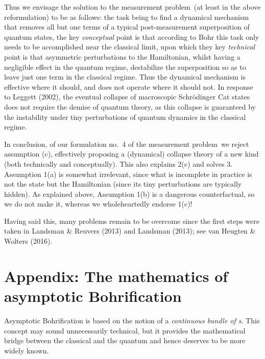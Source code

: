 \documentclass[12pt]{article}
\newcommand{\mmp}{measurement problem}
\begin{document}
 Thus we envisage  the solution to the \mmp\ (at least in the above reformulation) to be as follows:
 the task being to find a dynamical mechanism that removes all but one terms of a typical post-measurement superposition of quantum states, the key \emph{conceptual} point is that according to Bohr this task only needs to be accomplished near the classical limit, upon which they key \emph{technical} point is that asymmetric perturbations to the Hamiltonian, whilst having a negligible effect in the quantum regime, destabilize the superposition so as to leave just one term in the classical regime. Thus the dynamical mechanism is effective where it should, and does not operate where it should not. 
In response to Leggett  (2002), the eventual collapse of macroscopic Schr\"{o}dinger Cat states does not require the
demise of quantum theory, as this collapse is guaranteed by the instability under tiny perturbations of quantum dynamics in the classical regime. 

In conclusion, of our formulation no.\ 4 of the \mmp\ we reject assumption (c), effectively proposing a (dynamical) collapse theory of a new kind (both technically and conceptually). 
 This also explains 2(c) and solves 3. Assumption 1(a) is somewhat irrelevant, since what is incomplete in practice is not the state but the Hamiltonian (since its tiny perturbations are typically hidden). As explained above,  Assumption 1(b) is a dangerous counterfactual, so we do not make it, whereas we wholeheartedly endorse 1(c)! 
 
 Having said this, many problems remain to be overcome since the first steps were taken in Landsman \& Reuvers (2013)
 and Landsman (2013); see van Heugten \& Wolters (2016).
\section*{Appendix: The mathematics of asymptotic Bohrification} 
Asymptotic Bohrification is based on the notion of a \emph{continuous bundle of \ca s}. This concept may sound unnecessarily technical, but it provides the  mathematical bridge between the classical and the quantum and hence deserves to be more widely known.
\end{document}
